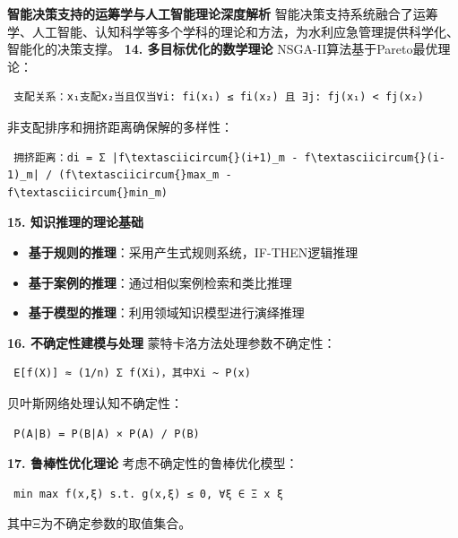 \begin{lstlisting}[language=Python] \end{lstlisting} \textbf{智能决策支持的运筹学与人工智能理论深度解析}
智能决策支持系统融合了运筹学、人工智能、认知科学等多个学科的理论和方法，为水利应急管理提供科学化、智能化的决策支撑。 \textbf{14. 多目标优化的数学理论} NSGA-II算法基于Pareto最优理论：
\begin{lstlisting} 支配关系：x₁支配x₂当且仅当∀i: fi(x₁) ≤ fi(x₂) 且 ∃j: fj(x₁) < fj(x₂) \end{lstlisting} 非支配排序和拥挤距离确保解的多样性：
\begin{lstlisting} 拥挤距离：di = Σ |f\textasciicircum{}(i+1)_m - f\textasciicircum{}(i-1)_m| / (f\textasciicircum{}max_m -
f\textasciicircum{}min_m) \end{lstlisting} \textbf{15. 知识推理的理论基础} \begin{itemize} \tightlist \item
\textbf{基于规则的推理}：采用产生式规则系统，IF-THEN逻辑推理 \item \textbf{基于案例的推理}：通过相似案例检索和类比推理 \item \textbf{基于模型的推理}：利用领域知识模型进行演绎推理
\end{itemize} \textbf{16. 不确定性建模与处理} 蒙特卡洛方法处理参数不确定性： \begin{lstlisting} E[f(X)] ≈ (1/n) Σ f(Xi)，其中Xi ~ P(x)
\end{lstlisting} 贝叶斯网络处理认知不确定性： \begin{lstlisting} P(A|B) = P(B|A) × P(A) / P(B) \end{lstlisting} \textbf{17. 鲁棒性优化理论}
考虑不确定性的鲁棒优化模型： \begin{lstlisting} min max f(x,ξ) s.t. g(x,ξ) ≤ 0, ∀ξ ∈ Ξ x ξ \end{lstlisting} 其中Ξ为不确定参数的取值集合。
